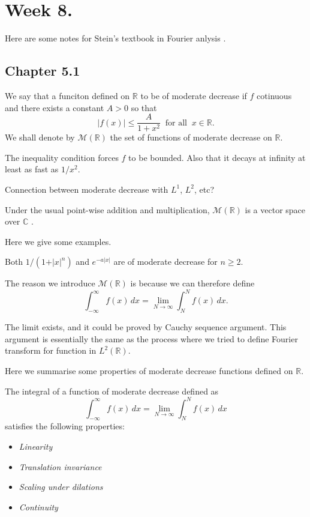 \section{Week 8.}
    
Here are some notes for Stein's textbook in Fourier anlysis \cite{stein2011fourier}.

\subsection{Chapter 5.1}

\begin{definition}
    We say that a funciton defined on $\mathbb R$ to be of moderate decrease if $f$ cotinuous and there exists a constant $A>0$ so that 
    \[\vert f(x)\vert \leq \frac{A}{1+x^2} ~\text{ for all }~ x\in\mathbb R.\] We shall denote by $\mathcal M(\mathbb R)$ the set of functions of moderate decrease on $\mathbb R$. 
\end{definition}

The inequality condition forces $f$ to be bounded. Also that it decays at infinity at least as fast as $1/x^2$.

\begin{question}
    Connection between moderate decrease with $L^1$, $L^2$, etc?
\end{question}

Under the usual point-wise addition and multiplication, $\mathcal M(\mathbb R)$ is a vector space over $\mathbb C$ .

Here we give some examples.
\begin{example}
    Both $1/(1+\vert x\vert^n)$ and $e^{-a \vert x\vert}$ are of moderate decrease for $n\geq 2$.
\end{example}

The reason we introduce $\mathcal M(\mathbb R)$ is because we can therefore define 
\[\int_{-\infty}^{\infty}f(x)\,dx=\lim_{N\to\infty}\int_N^N f(x)\,dx.\]

The limit exists, and it could be proved by Cauchy sequence argument. This argument is essentially the same as the process where we tried to define Fourier transform for function in $L^2(\mathbb R)$. 

Here we summarise some properties of moderate decrease functions defined on $\mathbb R$. 
\begin{proposition}
    The integral of a function of moderate decrease defined as 
    \[\int_{-\infty}^{\infty}f(x)\,dx=\lim_{N\to\infty}\int_N^N f(x)\,dx\] 
    satisfies the following properties:
    \begin{itemize}
        \item \textit{Linearity}
        \item \textit{Translation invariance}
        \item \textit{Scaling under dilations}
        \item \textit{Continuity}
    \end{itemize}
\end{proposition}


